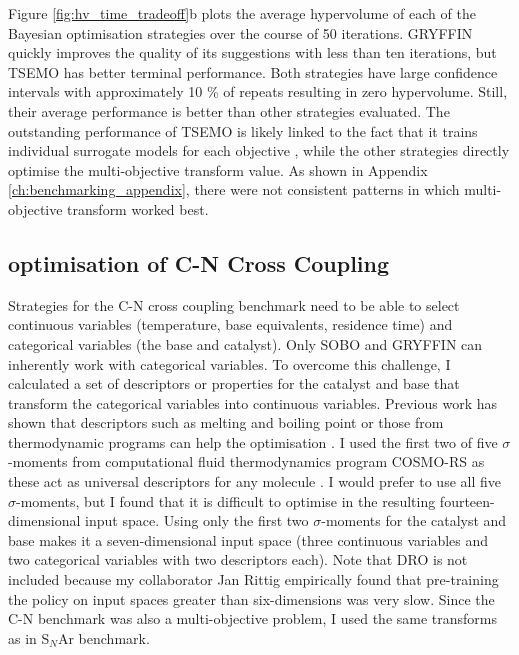 Figure \ref{fig:hv_time_tradeoff}b plots the average hypervolume of each of the Bayesian optimisation strategies over the course of 50 iterations. GRYFFIN quickly improves the quality of its suggestions with less than ten iterations, but TSEMO has better terminal performance. Both strategies have large confidence intervals with approximately 10 \% of repeats resulting in zero hypervolume. Still, their average performance is better than other strategies evaluated. The outstanding performance of TSEMO is likely linked to the fact that it trains individual surrogate models for each objective \cite{Bradford2018}, while the other strategies directly optimise the multi-objective transform value. As shown in Appendix \ref{ch:benchmarking_appendix}, there were not consistent patterns in which multi-objective transform worked best.

\subsection{optimisation of C-N Cross Coupling}

Strategies for the C-N cross coupling benchmark need to be able to select continuous variables (temperature, base equivalents, residence time) and categorical variables (the base and catalyst). Only SOBO and GRYFFIN can inherently work with categorical variables. To overcome this challenge, I calculated a set of descriptors or properties for the catalyst and base that transform the categorical variables into continuous variables. Previous work has shown that descriptors such as melting and boiling point or those from thermodynamic programs can help the optimisation \cite{Amar2019, Hase2020a}. I used the first two of five $\sigma$-moments from computational fluid thermodynamics program COSMO-RS as these act as universal descriptors for any molecule \cite{Zissimos2002}. I would prefer to use all five $\sigma$-moments, but I found that it is difficult to optimise in the resulting fourteen-dimensional input space. Using only the first two $\sigma$-moments for the catalyst and base makes it a seven-dimensional input space (three continuous variables and two categorical variables with two descriptors each).  Note that DRO is not included because my collaborator Jan Rittig empirically found that pre-training the policy on input spaces greater than six-dimensions was very slow. Since the C-N benchmark was also a multi-objective problem, I used the same transforms as in S$_N$Ar benchmark.

